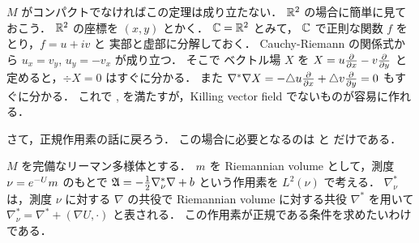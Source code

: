 $M$ がコンパクトでなければこの定理は成り立たない．
${\mathbb R}^2$ の場合に簡単に見ておこう．
${\mathbb R}^2$ の座標を $(x,y)$ とかく．
${\mathbb C}={\mathbb R}^2$ とみて， ${\mathbb C}$ で正則な関数 $f$ をとり，$f=u+iv$ と
実部と虚部に分解しておく．
Cauchy-Riemann の関係式から $u_x=v_y$, $u_y=-v_x$ が成り立つ．
そこで ベクトル場 $X$ を $X= u\frac{\partial}{\partial x}- v\frac{\partial}{\partial y}$
と定めると，$\div X=0$ はすぐに分かる．
また
$\nabla^*\nabla X
= - \triangle u\frac{\partial}{\partial x} + \triangle v\frac{\partial}{\partial y}=0$
もすぐに分かる．
これで ,  を満たすが，Killing vector field
でないものが容易に作れる．

\bigskip
さて，正規作用素の話に戻ろう．
この場合に必要となるのは  と  だけである．

\renewcommand{\tb}{b}


\bigskip
$M$ を完備なリーマン多様体とする．
$m$ を Riemannian volume として，測度 $\nu=e^{-U}m$ のもとで
 $\gen = -\frac{1}{2} \nabla_\nu^* \nabla + \tb$
という作用素を $L^2(\nu)$ で考える．
$\nabla_\nu^*$ は，測度 $\nu$ に対する $\nabla$ の共役で
Riemannian volume に対する共役 $\nabla^*$ を用いて
$\nabla_\nu^* = \nabla^* + (\nabla U, \cdot)$ と表される．
この作用素が正規である条件を求めたいわけである．

